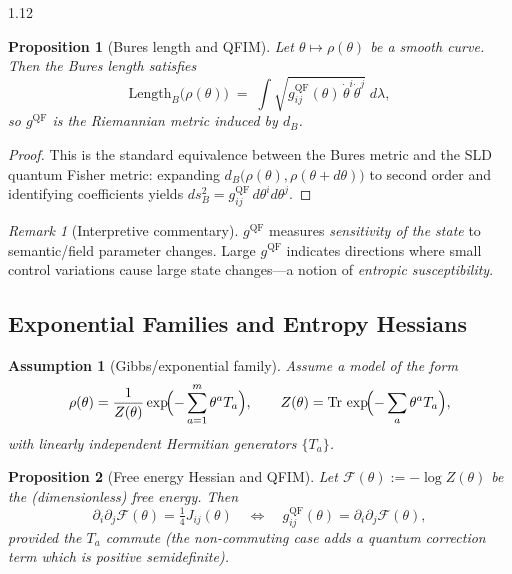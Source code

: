 \documentclass[12pt,a4paper]{article}
\numberwithin{equation}{section}
\newtheorem{assumption}{Assumption}[section]
\newtheorem{proposition}{Proposition}[section]
\theoremstyle{remark}
\newtheorem{remark}{Remark}[section]
\theoremstyle{definition}
\begin{document}
\begin{spacing}{1.12}
\begin{proposition}[Bures length and QFIM]\label{prop:E-bures-qfi}
Let $\theta\mapsto \rho(\theta)$ be a smooth curve. Then the Bures length satisfies
\[
\mathrm{Length}_B\!\bigl(\rho(\theta)\bigr) \;=\; \int \sqrt{ g^{\mathrm{QF}}_{ij}(\theta)\,\dot{\theta}^i\dot{\theta}^j}\; d\lambda,
\]
so $g^{\mathrm{QF}}$ is the Riemannian metric induced by $d_B$.
\end{proposition}

\begin{proof}
This is the standard equivalence between the Bures metric and the SLD quantum Fisher metric: expanding $d_B\bigl(\rho(\theta),\rho(\theta+d\theta)\bigr)$ to second order and identifying coefficients yields $ds_B^2=g^{\mathrm{QF}}_{ij}\,d\theta^i d\theta^j$.
\end{proof}

\begin{remark}[Interpretive commentary]
$g^{\mathrm{QF}}$ measures \emph{sensitivity of the state} to semantic/field parameter changes. Large $g^{\mathrm{QF}}$ indicates directions where small control variations cause large state changes---a notion of \emph{entropic susceptibility}.
\end{remark}

\subsection{Exponential Families and Entropy Hessians}\label{sec:E-exponential}

\begin{assumption}[Gibbs/exponential family]\label{ass:E-gibbs}
Assume a model of the form
\[
\rho(\theta) = \frac{1}{Z(\theta)}\exp\!\Bigl(-\sum_{a=1}^m \theta^a T_a\Bigr),\qquad
Z(\theta)=\mathrm{Tr}\,\exp\!\Bigl(-\sum_a \theta^a T_a\Bigr),
\]
with linearly independent Hermitian \emph{generators} $\{T_a\}$.
\end{assumption}

\begin{proposition}[Free energy Hessian and QFIM]\label{prop:E-free-energy}
Let $\mathcal{F}(\theta) := -\log Z(\theta)$ be the (dimensionless) free energy. Then
\[
\partial_i \partial_j \mathcal{F}(\theta) = \tfrac{1}{4} J_{ij}(\theta)
\quad\Longleftrightarrow\quad
g^{\mathrm{QF}}_{ij}(\theta) = \partial_i \partial_j \mathcal{F}(\theta),
\]
provided the $T_a$ commute (the non-commuting case adds a quantum correction term which is positive semidefinite).
\end{proposition}


\end{spacing}
\end{document}
